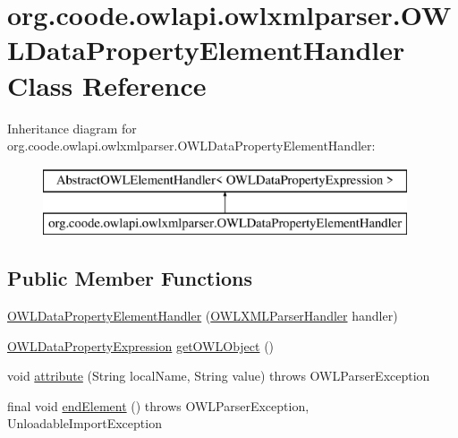 \hypertarget{classorg_1_1coode_1_1owlapi_1_1owlxmlparser_1_1_o_w_l_data_property_element_handler}{\section{org.\-coode.\-owlapi.\-owlxmlparser.\-O\-W\-L\-Data\-Property\-Element\-Handler Class Reference}
\label{classorg_1_1coode_1_1owlapi_1_1owlxmlparser_1_1_o_w_l_data_property_element_handler}
}
Inheritance diagram for org.\-coode.\-owlapi.\-owlxmlparser.\-O\-W\-L\-Data\-Property\-Element\-Handler\-:\begin{figure}[H]
\begin{center}
\leavevmode
\includegraphics[height=2.000000cm]{classorg_1_1coode_1_1owlapi_1_1owlxmlparser_1_1_o_w_l_data_property_element_handler}
\end{center}
\end{figure}
\subsection*{Public Member Functions}
\begin{DoxyCompactItemize}
\item 
\hyperlink{classorg_1_1coode_1_1owlapi_1_1owlxmlparser_1_1_o_w_l_data_property_element_handler_a9ba493afdf220b703d621ba0c711e633}{O\-W\-L\-Data\-Property\-Element\-Handler} (\hyperlink{classorg_1_1coode_1_1owlapi_1_1owlxmlparser_1_1_o_w_l_x_m_l_parser_handler}{O\-W\-L\-X\-M\-L\-Parser\-Handler} handler)
\item 
\hyperlink{interfaceorg_1_1semanticweb_1_1owlapi_1_1model_1_1_o_w_l_data_property_expression}{O\-W\-L\-Data\-Property\-Expression} \hyperlink{classorg_1_1coode_1_1owlapi_1_1owlxmlparser_1_1_o_w_l_data_property_element_handler_a3e9f0952f9500d6eff62e06679ff53a9}{get\-O\-W\-L\-Object} ()
\item 
void \hyperlink{classorg_1_1coode_1_1owlapi_1_1owlxmlparser_1_1_o_w_l_data_property_element_handler_a673a8e9297413701dd5ed77f3e337a00}{attribute} (String local\-Name, String value)  throws O\-W\-L\-Parser\-Exception 
\item 
final void \hyperlink{classorg_1_1coode_1_1owlapi_1_1owlxmlparser_1_1_o_w_l_data_property_element_handler_a4d0f110e4e9929054daefe6c6c6465f2}{end\-Element} ()  throws O\-W\-L\-Parser\-Exception, Unloadable\-Import\-Exception 
\end{DoxyCompactItemize}
